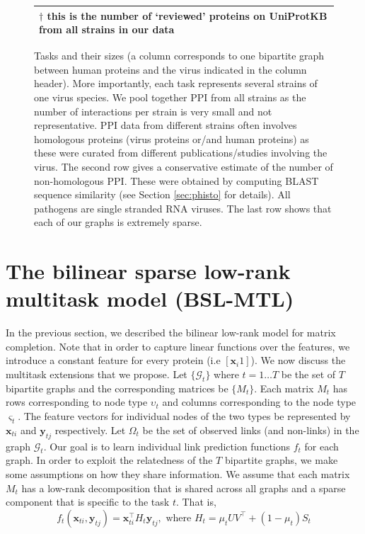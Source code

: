 \documentclass{bioinfo}
\begin{document}
\begin{figure}
\begin{floatrow}
{\begin{footnotesize}
\begin{tabular}{c|r|r|r}
\multicolumn{4}{l}{\scriptsize{$\dagger$ this is the number of `reviewed' proteins on UniProtKB from all strains in our data}} \\ \hline
\end{tabular}
\end{footnotesize}
}
{
\caption{Tasks and their sizes (a column corresponds to one bipartite graph between human proteins and the virus indicated in the column header). More importantly, each task represents several strains of one virus species. We pool together PPI from all strains as the number of interactions per strain is very small and not representative. PPI data from different strains often involves homologous proteins (virus proteins or/and human proteins) as these were curated from different publications/studies involving the virus. The second row gives a conservative estimate of the number of non-homologous PPI. These were obtained by computing BLAST sequence similarity (see Section \ref{sec:phisto} for details). All pathogens are single stranded RNA viruses. The last row shows that each of our graphs is extremely sparse.} 
\label{datasets}
}
\end{floatrow}
\end{figure}


\section{The bilinear sparse low-rank multitask model (BSL-MTL)} 
\label{ourmodel}
In the previous section, we described the bilinear low-rank model for matrix completion. 
Note that in order to capture linear functions over the features, we introduce a constant feature for every protein 
(i.e $[\mathbf{x}_i 1]$). We now discuss the multitask extensions that we propose. Let $\{\mathcal{G}_t\}$ where $t=1 \ldots T$ be the set of $T$ bipartite graphs and the corresponding matrices be $\{M_t\}$. Each matrix $M_t$ has rows corresponding to node type $\upsilon_t$ and columns corresponding to the node type $\varsigma_t$. The feature vectors for individual nodes of the two types be represented by $\mathbf{x}_{ti}$ and $\mathbf{y}_{tj}$ respectively. Let $\Omega_t$ be the set of observed links (and non-links) in the graph $\mathcal{G}_t$. Our goal is to learn individual link prediction functions $f_t$ for each graph. In order to exploit the relatedness of the $T$ bipartite graphs, we make some assumptions on how they share information. We assume that each matrix $M_t$ has a low-rank decomposition that is shared across all graphs and a sparse component that is specific to the task $t$. That is,
\begin{equation}
f_t(\mathbf{x}_{ti}, \mathbf{y}_{tj}) = \mathbf{x}_{ti}^\intercal H_t \mathbf{y}_{tj}, \textrm{ where } H_t = \mu_t U V^\intercal + (1-\mu_t)  S_t
\end{equation}
\end{document}
